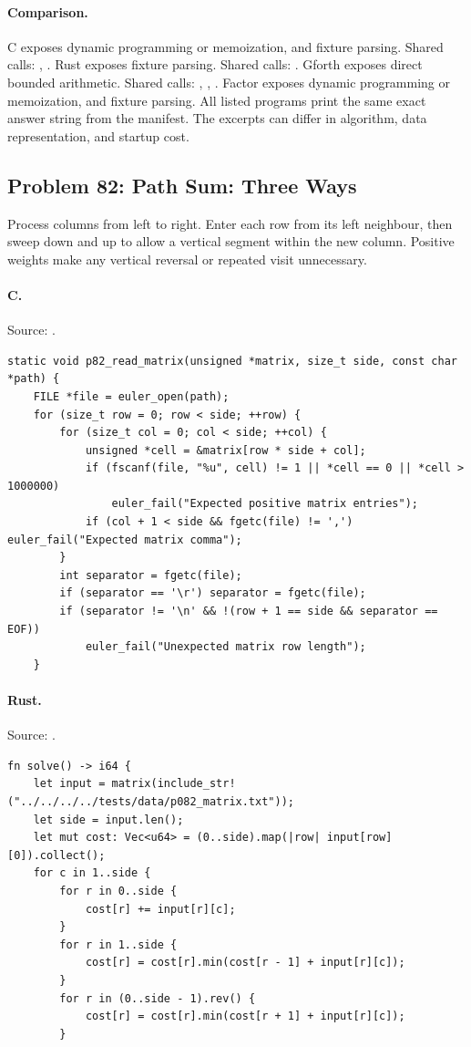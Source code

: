\paragraph{Comparison.}
C exposes dynamic programming or memoization, and fixture parsing. Shared calls: \texttt{}, \texttt{}. Rust exposes fixture parsing. Shared calls: \texttt{}. Gforth exposes direct bounded arithmetic. Shared calls: \texttt{}, \texttt{}, \texttt{}. Factor exposes dynamic programming or memoization, and fixture parsing.
All listed programs print the same exact answer string from the manifest. The excerpts can differ in algorithm, data representation, and startup cost.

\subsection{Problem 82: Path Sum: Three Ways}
\label{walkthrough:p82}
Process columns from left to right. Enter each row from its left neighbour, then sweep down and up to allow a vertical segment within the new column. Positive weights make any vertical reversal or repeated visit unnecessary.

\paragraph{C.} Source: .
\begin{lstlisting}
static void p82_read_matrix(unsigned *matrix, size_t side, const char *path) {
    FILE *file = euler_open(path);
    for (size_t row = 0; row < side; ++row) {
        for (size_t col = 0; col < side; ++col) {
            unsigned *cell = &matrix[row * side + col];
            if (fscanf(file, "%u", cell) != 1 || *cell == 0 || *cell > 1000000)
                euler_fail("Expected positive matrix entries");
            if (col + 1 < side && fgetc(file) != ',') euler_fail("Expected matrix comma");
        }
        int separator = fgetc(file);
        if (separator == '\r') separator = fgetc(file);
        if (separator != '\n' && !(row + 1 == side && separator == EOF))
            euler_fail("Unexpected matrix row length");
    }
\end{lstlisting}

\paragraph{Rust.} Source: .
\begin{lstlisting}
fn solve() -> i64 {
    let input = matrix(include_str!("../../../../tests/data/p082_matrix.txt"));
    let side = input.len();
    let mut cost: Vec<u64> = (0..side).map(|row| input[row][0]).collect();
    for c in 1..side {
        for r in 0..side {
            cost[r] += input[r][c];
        }
        for r in 1..side {
            cost[r] = cost[r].min(cost[r - 1] + input[r][c]);
        }
        for r in (0..side - 1).rev() {
            cost[r] = cost[r].min(cost[r + 1] + input[r][c]);
        }
\end{lstlisting}

